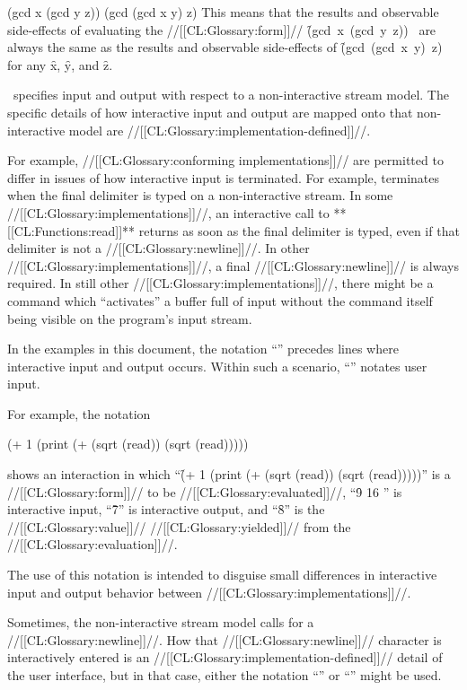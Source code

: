 \code
 (gcd x (gcd y z)) \EQ (gcd (gcd x y) z)
\endcode
This means that the results and observable side-effects of evaluating
the //[[CL:Glossary:form]]//
\hbox{\f{(gcd x (gcd y z))} } are always the same as the results
and observable side-effects of
\hbox{\f{(gcd (gcd x y) z)} } for any 
\f{x}, \f{y}, and \f{z}.
                      


\itemitem{{\OUT}}

\clisp\ specifies input and output with respect to a non-interactive stream model.
The specific details of how interactive input and output are mapped onto that
non-interactive model are //[[CL:Glossary:implementation-defined]]//.

For example, //[[CL:Glossary:conforming implementations]]// are permitted to differ in issues 
of how interactive input is terminated.  For example, 
terminates when the final delimiter is typed on a non-interactive stream.
In some //[[CL:Glossary:implementations]]//, an interactive call to **[[CL:Functions:read]]** returns
as soon as the final delimiter is typed, even if that delimiter is not a //[[CL:Glossary:newline]]//.
In other //[[CL:Glossary:implementations]]//, a final //[[CL:Glossary:newline]]// is always required.
In still other //[[CL:Glossary:implementations]]//, there might be a command which ``activates''
a buffer full of input without the command itself being visible on the program's
input stream.

In the examples in this document, the notation ``{\OUT}'' precedes 
lines where interactive input and output occurs.  Within such a scenario,
``'' notates user input.

For example, the notation

\code
 (+ 1 (print (+ (sqrt (read)) (sqrt (read)))))
\OUT {}
\endcode

shows an interaction in which
  ``\f{(+ 1 (print (+ (sqrt (read)) (sqrt (read)))))}''
    is a //[[CL:Glossary:form]]// to be //[[CL:Glossary:evaluated]]//,
  ``\f{9 16 }'' is interactive input,
  ``\f{7}'' is interactive output, and 
  ``\f{8}'' is the //[[CL:Glossary:value]]// //[[CL:Glossary:yielded]]// from the //[[CL:Glossary:evaluation]]//.

The use of this notation is intended to disguise small differences 
in interactive input and output behavior between //[[CL:Glossary:implementations]]//.

Sometimes, the non-interactive stream model calls for a //[[CL:Glossary:newline]]//.
How that //[[CL:Glossary:newline]]// character is interactively entered is an 
//[[CL:Glossary:implementation-defined]]// detail of the user interface, but in that
case, either the notation ``\NewlineChar'' or ``\CRLF'' might be used.

